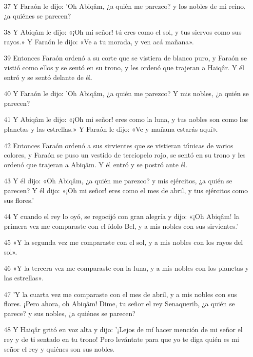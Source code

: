 \par 37 Y Faraón le dijo: 'Oh Abiqâm, ¿a quién me parezco? y los nobles de mi reino, ¿a quiénes se parecen?

\par 38 Y Abiqâm le dijo: «¡Oh mi señor! tú eres como el sol, y tus siervos como sus rayos.» Y Faraón le dijo: «Ve a tu morada, y ven acá mañana».

\par 39 Entonces Faraón ordenó a su corte que se vistiera de blanco puro, y Faraón se vistió como ellos y se sentó en su trono, y les ordenó que trajeran a Haiqâr. Y él entró y se sentó delante de él.

\par 40 Y Faraón le dijo: 'Oh Abiqâm, ¿a quién me parezco? Y mis nobles, ¿a quién se parecen?

\par 41 Y Abiqâm le dijo: «¡Oh mi señor! eres como la luna, y tus nobles son como los planetas y las estrellas.» Y Faraón le dijo: «Ve y mañana estarás aquí».

\par 42 Entonces Faraón ordenó a sus sirvientes que se vistieran túnicas de varios colores, y Faraón se puso un vestido de terciopelo rojo, se sentó en su trono y les ordenó que trajeran a Abiqâm. Y él entró y se postró ante él.

\par 43 Y él dijo: «Oh Abiqâm, ¿a quién me parezco? y mis ejércitos, ¿a quién se parecen? Y él dijo: »¡Oh mi señor! eres como el mes de abril, y tus ejércitos como sus flores.'

\par 44 Y cuando el rey lo oyó, se regocijó con gran alegría y dijo: «¡Oh Abiqâm! la primera vez me comparaste con el ídolo Bel, y a mis nobles con sus sirvientes.'

\par 45 «Y la segunda vez me comparaste con el sol, y a mis nobles con los rayos del sol».

\par 46 «Y la tercera vez me comparaste con la luna, y a mis nobles con los planetas y las estrellas».

\par 47 'Y la cuarta vez me comparaste con el mes de abril, y a mis nobles con sus flores. ¡Pero ahora, oh Abiqâm! Dime, tu señor el rey Senaquerib, ¿a quién se parece? y sus nobles, ¿a quiénes se parecen?

\par 48 Y Haiqâr gritó en voz alta y dijo: '¡Lejos de mí hacer mención de mi señor el rey y de ti sentado en tu trono! Pero levántate para que yo te diga quién es mi señor el rey y quiénes son sus nobles.

